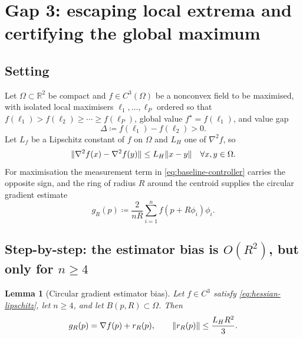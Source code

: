 \documentclass[11pt,a4paper]{article}
\theoremstyle{plain}
\newtheorem{lemma}{Lemma}
\theoremstyle{definition}
\newcommand{\R}{\mathbb{R}}
\DeclarePairedDelimiter{\norm}{\lVert}{\rVert}
\newcommand{\NotationContext}[1]{\markboth{#1}{#1}}
\begin{document}
\section{Gap 3: escaping local extrema and certifying the global maximum}\label{sec:gap3}
\NotationContext{field}

\subsection{Setting}\label{sec:gap3-setting}

Let $\Omega\subset\R^2$ be compact and $f\in C^3(\Omega)$ be a nonconvex field to be maximised,
with isolated local maximisers $\ell_1,\ldots,\ell_P$ ordered so that
$f(\ell_1)>f(\ell_2)\geq\cdots\geq f(\ell_P)$, global value $f^\star=f(\ell_1)$, and value gap
\begin{equation}\label{eq:value-gap}
    \Delta\coloneqq f(\ell_1)-f(\ell_2)>0.
\end{equation}
Let $L_f$ be a Lipschitz constant of $f$ on $\Omega$ and $L_H$ one of $\nabla^2f$, so
\begin{equation}\label{eq:hessian-lipschitz}
    \norm{\nabla^2f(x)-\nabla^2f(y)}\leq L_H\norm{x-y}
    \quad\forall x,y\in\Omega .
\end{equation}
For maximisation the measurement term in \eqref{eq:baseline-controller} carries the opposite
sign, and the ring of radius $R$ around the centroid supplies the circular gradient estimate
\begin{equation}\label{eq:circular-estimator}
    g_R(p)\coloneqq\frac{2}{nR}\sum_{i=1}^nf\!\left(p+R\phi_i\right)\phi_i .
\end{equation}

\subsection{Step-by-step: the estimator bias is $O(R^2)$, but only for $n\geq4$}\label{sec:gap3-bias}

\begin{lemma}[Circular gradient estimator bias]\label{lem:estimator-bias}
Let $f\in C^3$ satisfy \eqref{eq:hessian-lipschitz}, let $n\geq4$, and let
$B(p,R)\subset\Omega$. Then
\begin{equation}\label{eq:estimator-bias}
    g_R(p)=\nabla f(p)+r_R(p),
    \qquad
    \norm{r_R(p)}\leq\frac{L_HR^2}{3}.
\end{equation}
\end{lemma}
\end{document}
